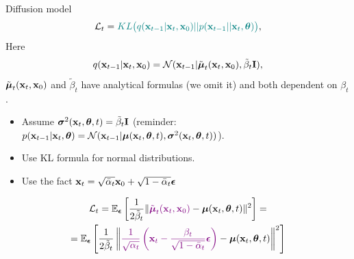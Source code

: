 \begin{frame}{Diffusion model}
	\[
		\mathcal{L}_t = {\color{teal}KL \bigl(q(\mathbf{x}_{t-1} | \mathbf{x}_t, \mathbf{x}_0) || p(\mathbf{x}_{t - 1} || \mathbf{x}_t, \boldsymbol{\theta} )\bigr)},
	\]
	Here
	\[
		q(\mathbf{x}_{t-1} | \mathbf{x}_t, \mathbf{x}_0) = \mathcal{N}(\mathbf{x}_{t-1} | \tilde{\boldsymbol{\mu}}_t(\mathbf{x}_t, \mathbf{x}_0), \tilde{\beta}_t \mathbf{I}),
	\]
	$\tilde{\boldsymbol{\mu}}_t(\mathbf{x}_t, \mathbf{x}_0)$ and $\tilde{\beta}_t$ have analytical formulas (we omit it) and both dependent on $\beta_t$.
	\begin{itemize}
		\item Assume $\boldsymbol{\sigma}^2(\mathbf{x}_t, \boldsymbol{\theta}, t) = \tilde{\beta}_t \mathbf{I}$ {\color{gray}(reminder: $p(\mathbf{x}_{t - 1} | \mathbf{x}_t, \boldsymbol{\theta}) = \mathcal{N}(\mathbf{x}_{t - 1} | \boldsymbol{\mu}(\mathbf{x}_t, \boldsymbol{\theta}, t), \boldsymbol{\sigma}^2(\mathbf{x}_t, \boldsymbol{\theta}, t))$)}.
		\item Use KL formula for normal distributions.
		\item Use the fact $\mathbf{x}_t = \sqrt{\bar{\alpha}_t} \mathbf{x}_{0} + \sqrt{1 - \bar{\alpha}_t} \boldsymbol{\epsilon}$
	\end{itemize}
	\begin{multline*}
		\mathcal{L}_t = \mathbb{E}_{\boldsymbol{\epsilon}} \left[ \frac{1}{2\tilde{\beta}_t} \| {\color{violet} \tilde{\boldsymbol{\mu}}_t(\mathbf{x}_t, \mathbf{x}_0)} - \boldsymbol{\mu}(\mathbf{x}_t, \boldsymbol{\theta}, t) \|^2 \right] = \\ 
		= \mathbb{E}_{\boldsymbol{\epsilon}} \left[ \frac{1}{2\tilde{\beta}_t} \left\| {\color{violet} \frac{1}{\sqrt{\alpha_t}}\left( \mathbf{x}_t - \frac{\beta_t}{\sqrt{1 - \bar{\alpha}_t} } \boldsymbol{\epsilon} \right)} - \boldsymbol{\mu}(\mathbf{x}_t, \boldsymbol{\theta}, t) \right\|^2 \right]
	\end{multline*}
	\end{frame}
